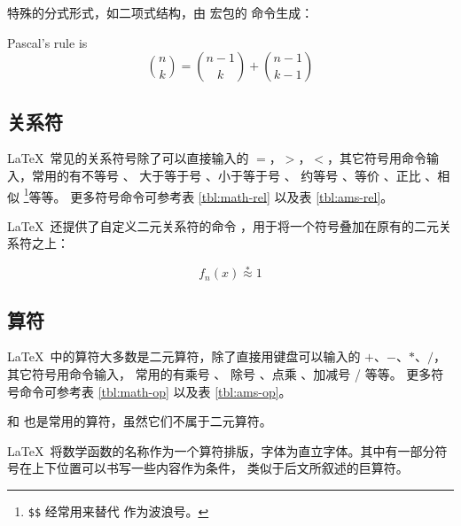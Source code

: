 特殊的分式形式，如二项式结构，由  宏包的  命令生成：
\begin{example}
Pascal’s rule is
\[
\binom{n}{k} =\binom{n-1}{k}
+ \binom{n-1}{k-1}
\]
\end{example}

\subsection{关系符}\label{subsec:math-rel}

\LaTeX\ 常见的关系符号除了可以直接输入的 $=$，$>$，$<$，其它符号用命令输入，常用的有不等号 、
大于等于号 、小于等于号 、
约等号 、等价 、正比 、相似 %
\footnote{\texttt\$\texttt\$ 经常用来替代 \cmd{\textasciitilde\marg*{}} 作为波浪号。}等等。
更多符号命令可参考表 \ref{tbl:math-rel} 以及表 \ref{tbl:ams-rel}。

\LaTeX\ 还提供了自定义二元关系符的命令 ，用于将一个符号叠加在原有的二元关系符之上：
\begin{example}
\[
f_n(x) \stackrel{*}{\approx} 1
\]
\end{example}

\subsection{算符}\label{subsec:math-op}

\LaTeX\ 中的算符大多数是二元算符，除了直接用键盘可以输入的 $+$、$-$、$*$、$/$，其它符号用命令输入，
常用的有乘号 、 除号 、点乘 、加减号  /  等等。
更多符号命令可参考表 \ref{tbl:math-op} 以及表 \ref{tbl:ams-op}。

 和  也是常用的算符，虽然它们不属于二元算符。

\LaTeX\ 将数学函数的名称作为一个算符排版，字体为直立字体。其中有一部分符号在上下位置可以书写一些内容作为条件，
类似于后文所叙述的巨算符。

